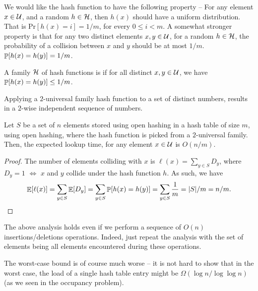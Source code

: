 We would like the hash function to have the following property -- For
any element $x \in \mathcal{U}$, and a random $h \in \mathcal{H}$, then $h(x)$ should
have a uniform distribution.  That is $\text{Pr}[h(x) = i] = 1/m$, for
every $0 \le i < m$. A somewhat stronger property is that for any two
distinct elements $x,y \in \mathcal{U}$, for a random $h \in \mathcal{H}$, the
probability of a collision between $x$ and $y$ should be at most
$1/m$. $\Prob{h(x) = h(y)} = 1/m$.

\begin{definition}
    A family $\mathcal{H}$ of hash functions is  if for
    all distinct $x,y \in \mathcal{U}$, we have $\Prob{h(x) = h(y)} \leq 1/m$.
\end{definition}

Applying a $2$-universal family hash function to a set of distinct
numbers, results in a $2$-wise independent sequence of numbers.


\begin{lemma}
    Let $S$ be a set of $n$ elements stored using open hashing in a
    hash table of size $m$, using open hashing, where the hash
    function is picked from a $2$-universal family. Then, the expected
    lookup time, for any element $x \in \mathcal{U}$ is $O(n/m)$.
\end{lemma}

\begin{proof}
    The number of elements colliding with $x$ is
    $\ell(x) = \sum_{y \in S} D_y$, where $D_y=1$ $\iff$ $x$ and $y$
    collide under the hash function $h$. As such, we have
    \begin{equation*}
        \Ex{\ell(x)}%
        =%
        \sum_{y \in S}\Ex{D_y}%
        =%
        \sum_{y \in S}\Prob{h(x) = h(y)}
        = \sum_{y \in S} \frac{1}{m}%
        = |S|/m 
        = n/m.
    \end{equation*}
\end{proof}

\begin{remark}
    The above analysis holds even if we perform a sequence of $O(n)$
    insertions/deletions operations. Indeed, just repeat the analysis
    with the set of elements being all elements encountered during
    these operations.

    The worst-case bound is of course much worse -- it is not hard to
    show that in the worst case, the load of a single hash table entry
    might be $\Omega(\log n/\log \log n)$ (as we seen in the occupancy
    problem).
\end{remark}

